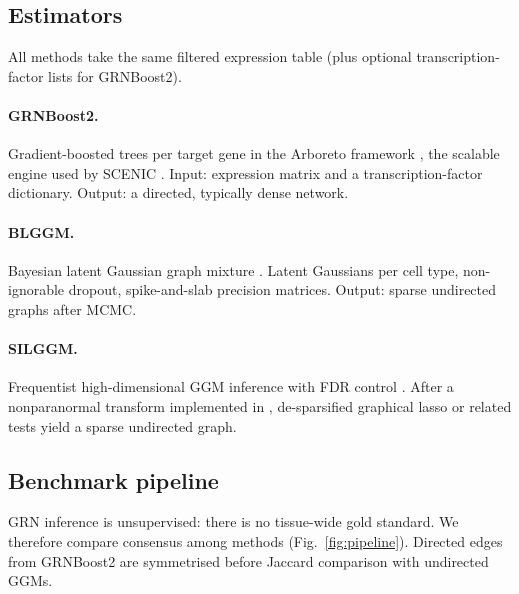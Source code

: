 \documentclass[sn-nature]{sn-jnl}
\begin{document}
\subsection{Estimators}
All methods take the same filtered expression table (plus optional
transcription-factor lists for GRNBoost2).

\paragraph{GRNBoost2.}
Gradient-boosted trees per target gene in the Arboreto framework
\cite{moermanGRNBoost2ArboretoEfficient2019}, the scalable engine used
by SCENIC \cite{aibarScenicSinglecellRegulatory2017}. Input: expression
matrix and a transcription-factor dictionary. Output: a directed,
typically dense network.

\paragraph{BLGGM.}
Bayesian latent Gaussian graph mixture
\cite{wuEstimatingHeterogeneousGene2022}. Latent Gaussians per cell
type, non-ignorable dropout, spike-and-slab precision matrices. Output:
sparse undirected graphs after MCMC.

\paragraph{SILGGM.}
Frequentist high-dimensional GGM inference with FDR control
\cite{zhangSILGGMExtensivePackage2018}. After a nonparanormal
transform \cite{liuNonparanormalSemiparametricEstimation2009} implemented
in  \cite{R-huge}, de-sparsified graphical lasso or related
tests yield a sparse undirected graph.

\subsection{Benchmark pipeline}
GRN inference is unsupervised: there is no tissue-wide gold standard.
We therefore compare consensus among methods (Fig.~\ref{fig:pipeline}).
Directed edges from GRNBoost2 are symmetrised before Jaccard
comparison with undirected GGMs.
\end{document}
